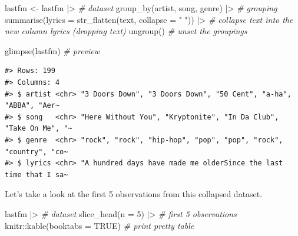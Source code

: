\documentclass[
  letterpaper,
]{latex/krantz}
\newenvironment{Shaded}{\begin{snugshade}}{\end{snugshade}}
\newcommand{\AttributeTok}[1]{\textcolor[rgb]{0.00,0.00,0.00}{#1}}
\newcommand{\CommentTok}[1]{\textcolor[rgb]{0.00,0.00,0.00}{\textit{#1}}}
\newcommand{\ConstantTok}[1]{\textcolor[rgb]{0.00,0.00,0.00}{#1}}
\newcommand{\DecValTok}[1]{\textcolor[rgb]{0.00,0.00,0.00}{#1}}
\newcommand{\FunctionTok}[1]{\textcolor[rgb]{0.00,0.00,0.00}{#1}}
\newcommand{\NormalTok}[1]{\textcolor[rgb]{0.00,0.00,0.00}{#1}}
\newcommand{\OtherTok}[1]{\textcolor[rgb]{0.00,0.00,0.00}{#1}}
\newcommand{\SpecialCharTok}[1]{\textcolor[rgb]{0.00,0.00,0.00}{#1}}
\newcommand{\StringTok}[1]{\textcolor[rgb]{0.00,0.00,0.00}{#1}}
\begin{document}
\begin{Shaded}
\begin{Highlighting}[]
\NormalTok{lastfm }\OtherTok{\textless{}{-}} 
\NormalTok{  lastfm }\SpecialCharTok{|\textgreater{}} \CommentTok{\# dataset}
  \FunctionTok{group\_by}\NormalTok{(artist, song, genre) }\SpecialCharTok{|\textgreater{}} \CommentTok{\# grouping}
  \FunctionTok{summarise}\NormalTok{(}\AttributeTok{lyrics =} \FunctionTok{str\_flatten}\NormalTok{(text, }\AttributeTok{collapse =} \StringTok{" "}\NormalTok{)) }\SpecialCharTok{|\textgreater{}}  \CommentTok{\# collapse text into the new column \textasciigrave{}lyrics\textasciigrave{} (dropping \textasciigrave{}text\textasciigrave{})}
  \FunctionTok{ungroup}\NormalTok{() }\CommentTok{\# unset the groupings}

\FunctionTok{glimpse}\NormalTok{(lastfm) }\CommentTok{\# preview}
\end{Highlighting}
\end{Shaded}

\begin{verbatim}
#> Rows: 199
#> Columns: 4
#> $ artist <chr> "3 Doors Down", "3 Doors Down", "50 Cent", "a-ha", "ABBA", "Aer~
#> $ song   <chr> "Here Without You", "Kryptonite", "In Da Club", "Take On Me", "~
#> $ genre  <chr> "rock", "rock", "hip-hop", "pop", "pop", "rock", "country", "co~
#> $ lyrics <chr> "A hundred days have made me olderSince the last time that I sa~
\end{verbatim}

Let's take a look at the first 5 observations from this collapsed
dataset.

\begin{Shaded}
\begin{Highlighting}[]
\NormalTok{lastfm }\SpecialCharTok{|\textgreater{}} \CommentTok{\# dataset}
  \FunctionTok{slice\_head}\NormalTok{(}\AttributeTok{n =} \DecValTok{5}\NormalTok{) }\SpecialCharTok{|\textgreater{}} \CommentTok{\# first 5 observations}
\NormalTok{  knitr}\SpecialCharTok{::}\FunctionTok{kable}\NormalTok{(}\AttributeTok{booktabs =} \ConstantTok{TRUE}\NormalTok{) }\CommentTok{\# print pretty table}
\end{Highlighting}
\end{Shaded}
\end{document}
